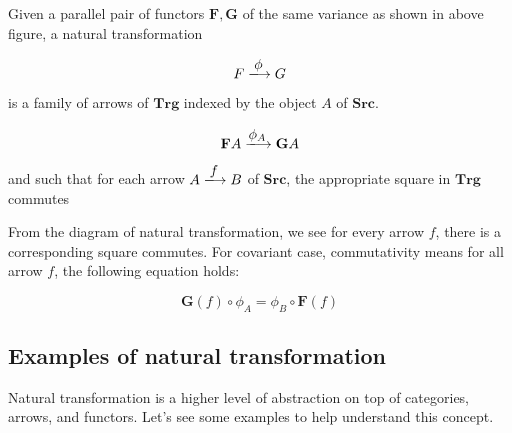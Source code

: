 \documentclass{article}
\begin{document}
\begin{definition}
\normalfont
Given a parallel pair of functors $\mathbf{F}, \mathbf{G}$ of the same variance as shown in above figure, a natural transformation

\[
F \arrowto{\phi} G
\]

is a family of arrows of $\pmb{Trg}$ indexed by the object $A$ of $\pmb{Src}$.

\[
\mathbf{F}A \arrowto{\phi_A} \mathbf{G}A
\]

and such that for each arrow $A \arrowto{f} B$ of $\pmb{Src}$, the appropriate square in $\pmb{Trg}$ commutes

\begin{center}

 \quad \quad \quad {}
\end{center}
\end{definition}

From the diagram of natural transformation, we see for every arrow $f$, there is a corresponding square commutes. For covariant case, commutativity means for all arrow $f$, the following equation holds:

\[
\mathbf{G}(f) \circ \phi_A= \phi_B \circ \mathbf{F}(f)
\]

\subsection{Examples of natural transformation}

Natural transformation is a higher level of abstraction on top of categories, arrows, and functors. Let's see some examples to help understand this concept.
\end{document}
